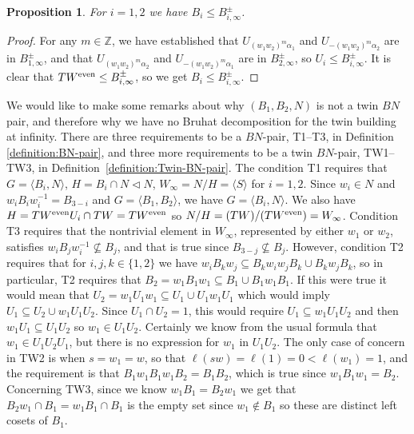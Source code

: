 \documentclass[pdftex]{sigma}
\numberwithin{equation}{section}
\newtheorem{Proposition}[Theorem]{Proposition}
 { \theoremstyle{definition}
\newtheorem{Definition}[Theorem]{Definition}
\newtheorem{Remark}[Theorem]{Remark} }
\def\Z{\mathbb{Z}}
\def\a{\alpha}
\def\la{\langle}
\def\ra{\rangle}
\begin{document}
\begin{Proposition}\label{prop:gens_fixing_ends}
For $i = 1,2$ we have $B_i \leq B_{i,\infty}^\pm$.
\end{Proposition}
\begin{proof}
For any $m\in\Z$, we have established that
$U_{(w_1 w_2)^m \a_1}$ and $U_{-(w_1 w_2)^m \a_2}$ are in $B_{1,\infty}^\pm$, and that
$U_{(w_1 w_2)^m \a_2}$ and $U_{-(w_1 w_2)^m \a_1}$ are in $B_{2,\infty}^\pm$, so $U_i \leq B_{i,\infty}^\pm$.
It is clear that $T W^{\rm even} \leq B_{i,\infty}^\pm$, so we get $B_i \leq B_{i,\infty}^\pm$.
\end{proof}

We would like to make some remarks about why $(B_1,B_2,N)$ is not a twin $BN$ pair, and therefore why we have no
Bruhat decomposition for the twin building at infinity. There are three requirements to be a $BN$-pair,
T1--T3, in Definition \ref{definition:BN-pair}, and three more requirements to be a twin $BN$-pair, TW1--TW3, in
Definition~\ref{definition:Twin-BN-pair}. The condition T1 requires that
$G=\la B_i,N\ra$, $H=B_i \cap N \lhd N$, $W_\infty =N/H = \la S\ra$ for $i = 1,2$. Since $w_i\in N$ and $w_i B_i w_i^{-1} = B_{3-i}$
and $G=\la B_1,B_2\ra$, we have $G=\la B_i,N\ra$. We also have $H = T W^{\rm even} U_i\cap TW = TW^{\rm even}$
so $N/H = (TW)/(TW^{\rm even}) = W_\infty$.
Condition T3 requires that the nontrivial element in $W_\infty$, represented by either $w_1$ or $w_2$, satisfies
$w_iB_j w_i^{-1}\not\subseteq B_j$, and that is true since $B_{3-j}\not\subseteq B_j$.
However, condition T2 requires that for $i,j,k\in\{1,2\}$ we have $w_iB_k w_j\subseteq B_k w_i w_jB_k \cup B_k w_j B_k$,
so in particular, T2 requires that $B_2 = w_1B_1w_1 \subseteq B_1 \cup B_1 w_1 B_1$.
If this were true it would mean that $U_2 = w_1U_1w_1 \subseteq U_1 \cup U_1 w_1 U_1$
which would imply $U_1 \subseteq U_2 \cup w_1 U_1 U_2$. Since $U_1\cap U_2 = 1$, this would require
$U_1 \subseteq w_1 U_1 U_2$ and then $w_1 U_1 \subseteq U_1 U_2$ so $w_1 \in U_1 U_2$. Certainly we know from
the usual formula that $w_1\in U_1 U_2 U_1$, but there is no expression for $w_1$ in $U_1 U_2$.
The only case of concern in TW2 is when $s = w_1 = w$, so that $\ell(sw) = \ell(1) = 0 < \ell(w_1) = 1$, and the requirement
is that $B_1 w_1 B_1 w_1 B_2 = B_1 B_2$, which is true since $w_1 B_1 w_1 = B_2$.
Concerning TW3, since we know $w_1 B_1 = B_2 w_1$ we get that $B_2 w_1 \cap B_1 = w_1 B_1 \cap B_1$ is the empty set
since $w_1\notin B_1$ so these are distinct left cosets of $B_1$.
\end{document}
